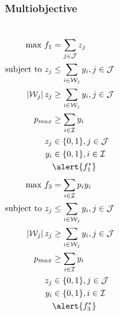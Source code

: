 \documentclass[10pt, compress]{beamer}
\begin{document}
\begin{frame}[fragile]
\frametitle{Multiobjective}
\begin{columns}[onlytextwidth]
\begin{align*}
\textrm{max } f_1 &= \sum_{j \in \mathcal{J}} z_j \\
\textrm{subject to } z_j &\leq \sum_{i \in \mathcal{W}_j} y_i, j \in \mathcal{J}\\
\left|\mathcal{W}_j\right|z_j &\geq \sum_{i \in \mathcal{W}_j} y_i, j \in \mathcal{J} \\
p_{max} &\geq \sum_{i \in \mathcal{I}} y_i  \\
z_j &\in \{0,1\}, j \in \mathcal{J} \\
y_i &\in \{0,1\}, i \in \mathcal{I} \\
& \alert{f_1^*}
\end{align*}
\begin{align*}
\textrm{max } f_3 &= \sum_{i \in \mathcal{I}} p_iy_i \\
\textrm{subject to } z_j &\leq \sum_{i \in \mathcal{W}_j} y_i, j \in \mathcal{J}\\
\left|\mathcal{W}_j\right|z_j &\geq \sum_{i \in \mathcal{W}_j} y_i, j \in \mathcal{J} \\
p_{max} &\geq \sum_{i \in \mathcal{I}} y_i  \\
z_j &\in \{0,1\}, j \in \mathcal{J} \\
y_i &\in \{0,1\}, i \in \mathcal{I} \\
&\alert{f_3^*}
\end{align*}
\end{columns}
\begin{center}
\end{center}
\end{frame}
\end{document}
